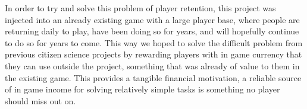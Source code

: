 In order to try and solve this problem of player retention, this project was injected into an already existing game with a large player base, where people are returning daily to play, have been doing so for years, and will hopefully continue to do so for years to come. This way we hoped to solve the difficult problem from previous citizen science projects by rewarding players with in game currency that they can use outside the project, something that was already of value to them in the existing game. This provides a tangible financial motivation, a reliable source of in game income for solving relatively simple tasks is something no player should miss out on.
\fi
